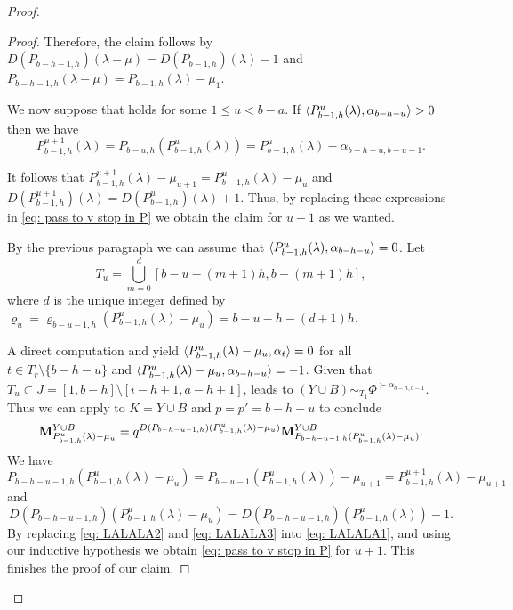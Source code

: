 \begin{proof}
\begin{proof}
Therefore, the claim follows by  
  $D(P_{b-h-1,h})(\lambda - \mu)= D(P_{b-1,h})(\lambda ) -1$ and $P_{b-h-1,h}(\lambda - \mu ) = P_{b-1,h}(\lambda) -\mu_1$. 

  \medskip
  We now suppose that   holds for some $1\leq u < b-a$. If $\langle P_{b-1,h}^u(\lambda) , \alpha_{b-h-u} \rangle>0$ then we have 
  \begin{equation}
     P^{u+1}_{b-1,h}(\lambda) =P_{b-u,h}(P_{b-1,h}^u(\lambda))= P_{b-1,h}^u(\lambda) -\alpha_{{b-h-u,b-u-1}} . 
  \end{equation}

It follows that $ P^{u+1}_{b-1,h}(\lambda)-\mu_{u+1} =P_{b-1,h}^u(\lambda)  - \mu_{u}  $ and $D(P^{u+1}_{b-1,h})(\lambda) = D(P^{u}_{b-1,h})(\lambda) +1$. 
Thus, by replacing these expressions in \cref{eq:  pass to v stop in P} we obtain the claim for $u+1$ as we wanted.

 By the previous paragraph we can assume that $\langle P_{b-1,h}^u(\lambda) , \alpha_{b-h-u} \rangle=0$. Let  
 \begin{equation}
     T_{u} = \bigcup_{m=0}^{d} [b-u-(m+1)h,b-(m+1)h],
 \end{equation}
 where $d$ is the unique integer defined by $\varrho_{u} = \varrho_{b-u-1,h}(  P_{b-1,h}^u(\lambda)- \mu_u) = b-u-h - (d+1)h$.

A direct computation and  yield $\langle P_{b-1,h}^u(\lambda)-\mu_{u} , \alpha_t \rangle=0$ for all $t\in  T_r\setminus \{b-h-u\}$ and $\langle P_{b-1,h}^u(\lambda)-\mu_{u} , \alpha_{b-h-u} \rangle=-1$. 
Given that $T_{u} \subset J = [1,b-h] \setminus [i-h+1,a-h+1]$,  leads to $(Y\cup B)\sim_{T_{1}}\Phi^{\succ \alpha_{b-h,b-1}}$.
  Thus we can apply  to $K=Y\cup B$ and $p=p'=b-h-u$ to conclude
\begin{equation}\label{eq: LALALA1}
    \mathbf{M}_{ P_{b-1,h}^u(\lambda)-\mu_{u}   }^{Y\cup B} = 
    q^{D(P_{b-h-u-1,h})(  P_{b-1,h}^u(\lambda)-\mu_{u}     )} 
    \mathbf{M}_{ P_{b-h-u-1,h}(P_{b-1,h}^u(\lambda)-\mu_{u}  ) }^{Y\cup B}  .
\end{equation}
We have 
\begin{equation}\label{eq: LALALA2}
    P_{b-h-u-1,h}(P_{b-1,h}^u(\lambda)-\mu_{u}  ) = P_{b-u-1}(P_{b-1,h}^u(\lambda))-\mu_{u+1} =P^{u+1}_{b-1,h}(\lambda) -\mu_{u+1}
\end{equation}
 and 
 \begin{equation}\label{eq: LALALA3}
    D(P_{b-h-u-1,h})(  P_{b-1,h}^u(\lambda)-\mu_{u}     ) =  
      D(P_{b-h-u-1,h})(  P_{b-1,h}^u(\lambda)    ) -1.
 \end{equation}
By replacing \cref{eq: LALALA2} and \cref{eq: LALALA3} into \cref{eq: LALALA1}, and using our inductive hypothesis we obtain
\cref{eq:  pass to v stop in P} for $u+1$. 
This finishes the proof of our claim. 
\end{proof}


\end{proof}
